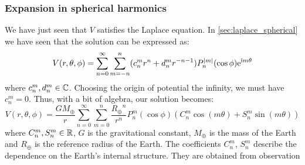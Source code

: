 \documentclass[../main.tex]{subfiles}
\begin{document}
\subsubsection{Expansion in spherical harmonics}
We have just seen that $V$ satisfies the Laplace equation. In \cref{sec:laplace_spherical} we have seen that the solution can be expressed as:
\begin{equation}
  V(r,\theta,\phi) = \sum_{n=0}^\infty \sum_{m=-n}^n (c_{n}^m r^{n} +d_n^mr^{-n-1})P_n^\abs{m}(\cos\phi) \mathrm{e}^{\mathrm{i} m\theta}
\end{equation}
where $c_{n}^m,d_n^m\in\mathbb{C}$. Choosing the origin of potential the infinity, we must have $c_{n}^m=0$. Thus, with a bit of algebra, our solution becomes:
\begin{equation}
  V(r,\theta,\phi) = \frac{GM_\oplus}{r}\sum_{n=0}^\infty \sum_{m=0}^n\frac{{R_\oplus}^n}{r^{n}}P_n^m(\cos\phi) (C_n^m\cos(m\theta)+S_n^m\sin(m\theta))
\end{equation}
where $C_n^m,S_n^m\in\mathbb{R}$, $G$ is the gravitational constant, $M_\oplus$ is the mass of the Earth and $R_\oplus$ is the reference radius of the Earth. The coefficients $C_n^m$, $S_n^m$ describe the dependence on the Earth's internal structure. They are obtained from observation
\end{document}
